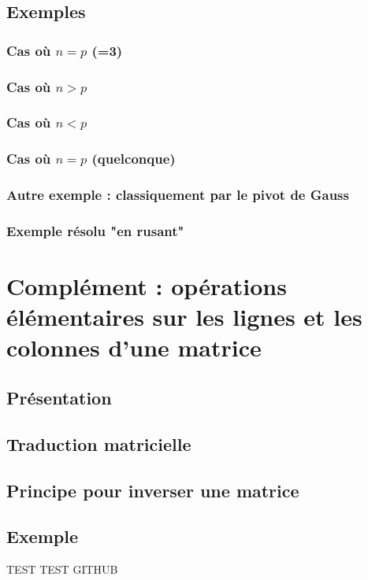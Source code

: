 \documentclass[12pt,a4paper,french]{book}
\begin{document}
	\section{Exemples}
		\subsection{Cas où $n=p$ (=3)}
		\subsection{Cas où $n>p$}
		\subsection{Cas où $n<p$}
		\subsection{Cas où $n=p$ (quelconque)}
		\subsection{Autre exemple : classiquement par le pivot de Gauss}
		\subsection{Exemple résolu "en rusant"}
		
\chapter{Complément : opérations élémentaires sur les lignes et les colonnes d'une matrice}
	\section{Présentation}
	\section{Traduction matricielle}
	\section{Principe pour inverser une matrice}
	\section{Exemple}
		TEST TEST GITHUB

	
	
\end{document}
